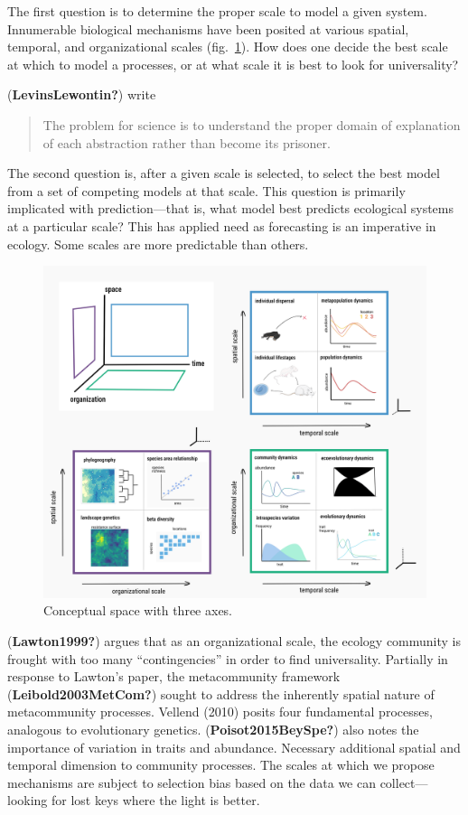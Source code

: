 \documentclass[10pt,oneside]{article}
\makeatletter
\def\maxwidth{\ifdim\Gin@nat@width>\linewidth\linewidth
\else\Gin@nat@width\fi}
\let\Oldincludegraphics\includegraphics
\renewcommand{\includegraphics}[1]{\Oldincludegraphics[width=\maxwidth]{#1}}
\makeatother
\begin{document}
The first question is to determine the proper scale to model a given
system. Innumerable biological mechanisms have been posited at various
spatial, temporal, and organizational scales (fig.~\ref{fig:slices}).
How does one decide the best scale at which to model a processes, or at
what scale it is best to look for universality?

(\textbf{LevinsLewontin?}) write

\begin{quote}
The problem for science is to understand the proper domain of
explanation of each abstraction rather than become its prisoner.
\end{quote}

The second question is, after a given scale is selected, to select the
best model from a set of competing models at that scale. This question
is primarily implicated with prediction---that is, what model best
predicts ecological systems at a particular scale? This has applied need
as forecasting is an imperative in ecology. Some scales are more
predictable than others.

\begin{figure}
\hypertarget{fig:slices}{%
\centering
\includegraphics{./figures/tensorslices.png}
\caption{Conceptual space with three axes.}\label{fig:slices}
}
\end{figure}

(\textbf{Lawton1999?}) argues that as an organizational scale, the
ecology community is frought with too many ``contingencies'' in order to
find universality. Partially in response to Lawton's paper, the
metacommunity framework (\textbf{Leibold2003MetCom?}) sought to address
the inherently spatial nature of metacommunity processes. Vellend (2010)
posits four fundamental processes, analogous to evolutionary genetics.
(\textbf{Poisot2015BeySpe?}) also notes the importance of variation in
traits and abundance. Necessary additional spatial and temporal
dimension to community processes. The scales at which we propose
mechanisms are subject to selection bias based on the data we can
collect---looking for lost keys where the light is better.
\end{document}

